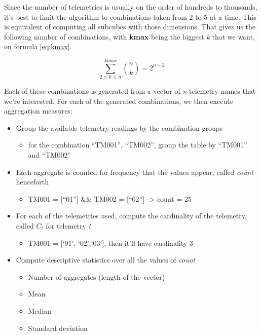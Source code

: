 Since the number of telemetries is usually on the order of hundreds to thousands, it's best to limit the algorithm to combinations taken from 2 to 5 at a time.
This is equivalent of computing all subcubes with those dimensions.
That gives us the following number of combinations, with \textbf{kmax} being the biggest \emph{k} that we want, on formula \ref{eq:kmax}.

\begin{equation} \label{eq:kmax}
\sum_{2\leq{k}\leq{n}}^{kmax}\binom nk = 2^{n-2}
\end{equation}

Each of these combinations is generated from a vector of \emph{n} telemetry names that we're interested.
For each of the generated combinations, we then execute aggregation measures:

\begin{itemize}[noitemsep]
\item
  Group the available telemetry readings by the combination groups
  \begin{itemize}
  \item
    for the combination ``TM001'', ``TM002'', group the table by ``TM001'' and ``TM002''
  \end{itemize}
\item
  Each aggregate is counted for frequency that the values appear, called \emph{count} henceforth

  \begin{itemize}
  \item
    TM001 = [``01''] \&\& TM002 = [``02''] -\textgreater{} count = 25
  \end{itemize}
\item
  For each of the telemetries used, compute the cardinality of the telemetry, called \(C_t\) for telemetry \emph{t}

  \begin{itemize}
  \item
    TM001 = [`01', `02',`03'], then it'll have cardinality 3
  \end{itemize}
\item
  Compute descriptive statistics over all the values of \emph{count}

  \begin{itemize}[noitemsep]
  \item Number of aggregates (length of the vector)
  \item Mean
  \item Median
  \item Standard deviation
  \end{itemize}
\end{itemize}

